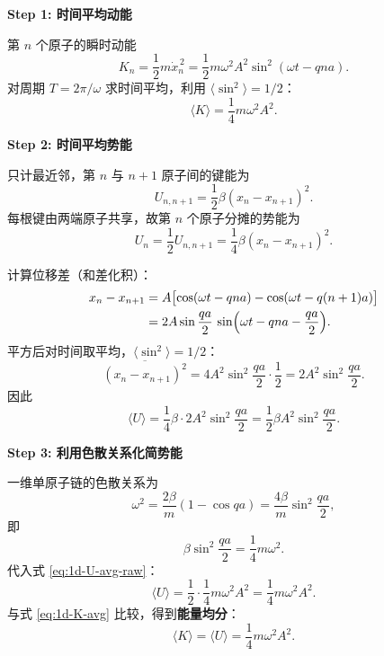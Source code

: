 \begin{derivationbox}[标准解题过程]
\textbf{Step 1: 时间平均动能}

第 $n$ 个原子的瞬时动能
\begin{equation}
K_n = \frac12 m\dot x_n^{\,2} = \frac12 m\omega^2 A^2\sin^2(\omega t-qna).
\end{equation}
对周期 $T=2\pi/\omega$ 求时间平均，利用 $\langle\sin^2\rangle=1/2$：
\begin{equation}
\boxed{\langle K\rangle = \frac14 m\omega^2 A^2.}
\label{eq:1d-K-avg}
\end{equation}

\textbf{Step 2: 时间平均势能}

只计最近邻，第 $n$ 与 $n+1$ 原子间的键能为
\begin{equation}
U_{n,n+1} = \frac12\beta(x_n-x_{n+1})^2.
\end{equation}
每根键由两端原子共享，故第 $n$ 个原子分摊的势能为
\begin{equation}
U_n = \frac12 U_{n,n+1} = \frac14\beta(x_n-x_{n+1})^2.
\end{equation}

计算位移差（和差化积）：
\begin{align}
x_n-x_{n+1} &= A\bigl[\cos(\omega t-qna)-\cos(\omega t-q(n+1)a)\bigr] \nonumber\\
&= 2A\sin\frac{qa}{2}\,\sin\Bigl(\omega t-qna-\frac{qa}{2}\Bigr).
\end{align}
平方后对时间取平均，$\langle\sin^2\rangle=1/2$：
\begin{equation}
\overline{(x_n-x_{n+1})^2} = 4A^2\sin^2\frac{qa}{2}\cdot\frac12 = 2A^2\sin^2\frac{qa}{2}.
\end{equation}
因此
\begin{equation}
\langle U\rangle = \frac14\beta\cdot 2A^2\sin^2\frac{qa}{2} = \frac12\beta A^2\sin^2\frac{qa}{2}.
\label{eq:1d-U-avg-raw}
\end{equation}

\textbf{Step 3: 利用色散关系化简势能}

一维单原子链的色散关系为
\begin{equation}
\omega^2 = \frac{2\beta}{m}(1-\cos qa) = \frac{4\beta}{m}\sin^2\frac{qa}{2},
\end{equation}
即
\begin{equation}
\beta\sin^2\frac{qa}{2} = \frac14 m\omega^2.
\end{equation}
代入式 \eqref{eq:1d-U-avg-raw}：
\begin{equation}
\langle U\rangle = \frac12\cdot\frac14 m\omega^2 A^2 = \frac14 m\omega^2 A^2.
\end{equation}
与式 \eqref{eq:1d-K-avg} 比较，得到\textbf{能量均分}：
\begin{equation}
\boxed{\langle K\rangle = \langle U\rangle = \frac14 m\omega^2 A^2.}
\end{equation}


\end{derivationbox}
